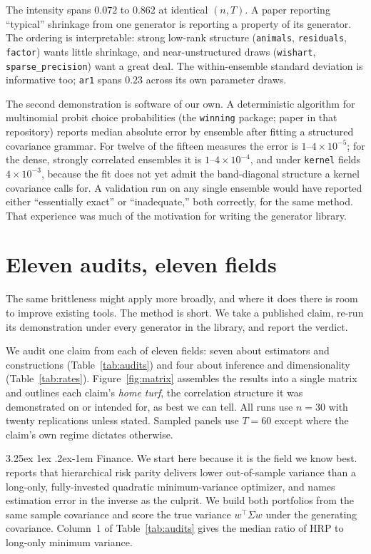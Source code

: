 \documentclass[11pt]{article}
\makeatletter
\renewcommand\paragraph{\@startsection{paragraph}{4}{\z@}%
  {3.25ex \@plus1ex \@minus.2ex}{-1em}%
  {\normalfont\normalsize\itshape}}
\renewcommand\paragraph{\@startsection{paragraph}{4}{\z@}%
  {3.25ex \@plus1ex \@minus.2ex}{-1em}%
  {\normalfont\normalsize\itshape}}
\makeatother
\begin{document}
The intensity spans $0.072$ to $0.862$ at identical $(n,T)$. A paper
reporting ``typical'' shrinkage from one generator is reporting a property
of its generator. The ordering is interpretable: strong low-rank structure
(\texttt{animals}, \texttt{residuals}, \texttt{factor}) wants little
shrinkage, and near-unstructured draws (\texttt{wishart},
\texttt{sparse\_precision}) want a great deal. The within-ensemble
standard deviation is informative too; \texttt{ar1} spans $0.23$ across
its own parameter draws.

The second demonstration is software of our own. A deterministic
algorithm for multinomial probit choice probabilities (the
\texttt{winning} package; paper in that repository) reports median
absolute error by ensemble after fitting a structured covariance grammar.
For twelve of the fifteen measures the error is $1$--$4\times10^{-5}$; for
the dense, strongly correlated ensembles it is $1$--$4\times10^{-4}$, and
under \texttt{kernel} fields $4\times10^{-3}$, because the fit does not
yet admit the band-diagonal structure a kernel covariance calls for. A
validation run on any single ensemble would have reported either
``essentially exact'' or ``inadequate,'' both correctly, for the same
method. That experience was much of the motivation for writing the
generator library.

\section{Eleven audits, eleven fields}

The same brittleness might apply more broadly, and where it does there
is room to improve existing tools. The method is short. We take a
published claim, re-run its demonstration under every generator in the
library, and report the verdict.

We audit one claim from each of eleven fields: seven about estimators and
constructions (Table~\ref{tab:audits}) and four about inference and
dimensionality (Table~\ref{tab:rates}). Figure~\ref{fig:matrix} assembles
the results into a single matrix and outlines each claim's \emph{home
turf}, the correlation structure it was demonstrated on or intended for,
as best we can tell. All runs
use $n=30$ with twenty replications unless stated. Sampled panels use
$T=60$ except where the claim's own regime dictates otherwise.

\paragraph{Finance.} We start here because it is the field we know best.
\citet{lopezdeprado2016} reports that hierarchical
risk parity delivers lower out-of-sample variance than a long-only,
fully-invested quadratic minimum-variance optimizer, and names estimation
error in the inverse as the culprit. We
build both portfolios from the same sample covariance and score the true
variance $w^{\top}\Sigma w$ under the generating covariance. Column~1 of
Table~\ref{tab:audits} gives the median ratio of HRP to long-only minimum
variance.
\end{document}
